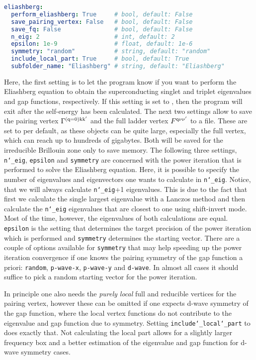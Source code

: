 \documentclass[\main/main.tex]{subfiles}
\begin{document}
\begin{minipage}{\textwidth}%
\begin{lstlisting}[language=yaml]
eliashberg:
  perform_eliashberg: True     # bool, default: False
  save_pairing_vertex: False   # bool, default: False
  save_fq: False               # bool, default: False
  n_eig: 2                     # int, default: 2
  epsilon: 1e-9                # float, default: 1e-6
  symmetry: "random"           # string, default: "random"
  include_local_part: True     # bool, default: True
  subfolder_name: "Eliashberg" # string, default: "Eliashberg"
\end{lstlisting}
\end{minipage}
Here, the first setting is to let the program know if you want to perform the Eliashberg equation to obtain the superconducting singlet and triplet eigenvalues and gap functions, respectively. If this setting is set to , then the program will exit after the self-energy has been calculated. The next two settings allow to save the pairing vertex $\Gamma^{(\text{q}=0)\text{k}\text{k}'}$ and the full ladder vertex $F^{\text{q}\nu\nu'}$ to a file. These are set to  per default, as these objects can be quite large, especially the full vertex, which can reach up to hundreds of gigabytes. Both will be saved for the irreducible Brillouin zone only to save memory. The following three settings, \texttt{n\char`_eig}, \texttt{epsilon} and \texttt{symmetry} are concerned with the power iteration that is performed to solve the Eliashberg equation. Here, it is possible to specify the number of eigenvalues and eigenvectors one wants to calculate in \texttt{n\char`_eig}. Notice, that we will always calculate \texttt{n\char`_eig}+1 eigenvalues. This is due to the fact that first we calculate the single largest eigenvalue with a Lanczos method and then calculate the \texttt{n\char`_eig} eigenvalues that are closest to one using shift-invert mode. Most of the time, however, the eigenvalues of both calculations are equal. \texttt{epsilon} is the setting that determines the target precision of the power iteration which is performed and \texttt{symmetry} determines the starting vector. There are a couple of options available for \texttt{symmetry} that may help speeding up the power iteration convergence if one knows the pairing symmetry of the gap function a priori: \texttt{random}, \texttt{p-wave-x}, \texttt{p-wave-y} and \texttt{d-wave}. In almost all cases it should suffice to pick a random starting vector for the power iteration. 

In principle one also needs the \textit{purely local} full and reducible vertices for the pairing vertex, however these can be omitted if one expects d-wave symmetry of the gap function, where the local vertex functions do not contribute to the eigenvalue and gap function due to symmetry. Setting \texttt{include\char`_local\char`_part} to  does exactly that. Not calculating the local part allows for a slightly larger frequency box and a better estimation of the eigenvalue and gap function for d-wave symmetry cases.
\end{document}
